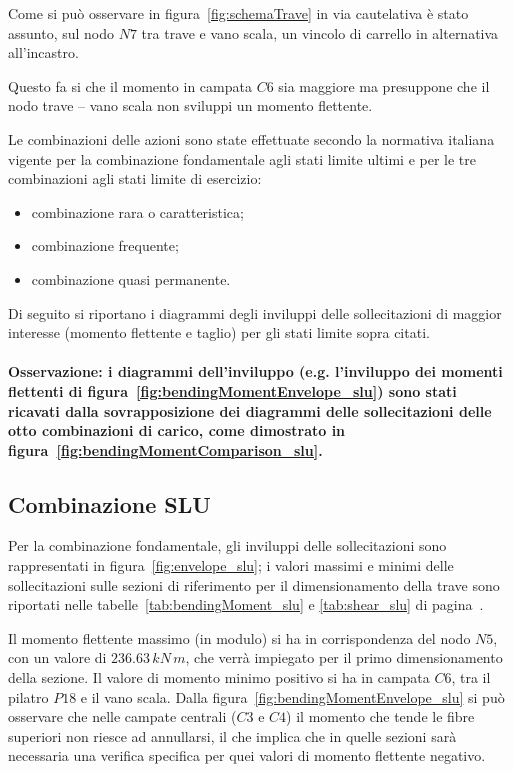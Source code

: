 Come si può osservare in figura~\ref{fig:schemaTrave} in via cautelativa è stato assunto, sul nodo $N7$ tra trave e vano scala, un vincolo di carrello in alternativa all'incastro. 

\noindent
Questo fa si che il momento in campata $C6$ sia maggiore ma presuppone che il nodo trave -- vano scala non sviluppi un momento flettente.

Le combinazioni delle azioni sono state effettuate secondo la normativa italiana vigente per la combinazione fondamentale agli stati limite ultimi e per le tre combinazioni agli stati limite di esercizio:
\begin{itemize}
 \item combinazione rara o caratteristica;
 \item combinazione frequente;
 \item combinazione quasi permanente.
\end{itemize}
Di seguito si riportano i diagrammi degli inviluppi delle sollecitazioni di maggior interesse (momento flettente e taglio) per gli stati limite sopra citati. 

\paragraph{Osservazione: i diagrammi dell'inviluppo (e.g. l'inviluppo dei momenti flettenti di figura~\ref{fig:bendingMomentEnvelope_slu}) sono stati ricavati dalla sovrapposizione dei diagrammi delle sollecitazioni delle otto combinazioni di carico, come dimostrato in figura~\ref{fig:bendingMomentComparison_slu}.}

\subsection{Combinazione SLU}
Per la combinazione fondamentale, gli inviluppi delle sollecitazioni sono rappresentati in figura~\ref{fig:envelope_slu}; i valori massimi e minimi delle sollecitazioni sulle sezioni di riferimento per il dimensionamento della trave sono riportati nelle tabelle~\ref{tab:bendingMoment_slu} e \ref{tab:shear_slu} di pagina~\pageref{tab:bendingMoment_slu}.

Il momento flettente massimo (in modulo) si ha in corrispondenza del nodo $N5$, con un valore di $236.63\,kN\,m$, che verrà impiegato per il primo dimensionamento della sezione. Il valore di momento minimo positivo si ha in campata $C6$, tra il pilatro $P18$ e il vano scala. Dalla figura~\ref{fig:bendingMomentEnvelope_slu} si può osservare che nelle campate centrali ($C3$ e $C4$) il momento che tende le fibre superiori non riesce ad annullarsi, il che implica che in quelle sezioni sarà necessaria una verifica specifica per quei valori di momento flettente negativo.

